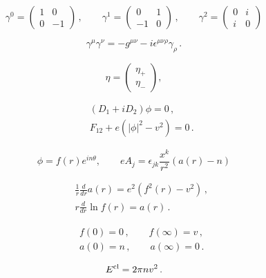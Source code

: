 \documentclass[]{article}
\begin{document}
\begin{equation}
	\gamma^0=\left( \begin{array}{cc}
		1&0\\
		0&-1 \end{array}\right)\,,\qquad
	\gamma^1=\left( \begin{array}{cc}
		0&1\\
		-1&0 \end{array}\right)\,,\qquad
	\gamma^2=\left( \begin{array}{cc}
		0&i\\
		i&0 \end{array}\right) \label{gamma}
\end{equation}

\begin{equation}
	\gamma^\mu \gamma^\nu =-g^{\mu\nu} -i\epsilon^{\mu\nu\rho}\gamma_\rho
	\,.\label{gagag}
\end{equation}

\begin{equation}
	\eta=\left( \begin{array}{c} \eta_+ \\ \eta_- \end{array} \right),
	\label{spinorcom}
\end{equation}

\begin{eqnarray}
	&&(D_1+iD_2)\phi =0\,,\label{bog1}\\
	&&F_{12}+e(|\phi |^2 -v^2 )=0 \,.\label{bog2}
\end{eqnarray}

\begin{equation}
	\phi =f(r) e^{in\theta},\qquad eA_j=\epsilon_{jk} \frac {x^k}{r^2}
	(a(r)-n) \label{vortex}
\end{equation}

\begin{eqnarray}
	&&\frac 1r \frac{d}{dr} a(r)=e^2\left( f^2(r)-v^2 \right)\,,\nonumber\\
	&&r \frac{d}{dr} \ln f(r) = a(r) \,.\label{af-eqs}
\end{eqnarray}

\begin{eqnarray}
	&& f(0)=0\,,\qquad f(\infty )=v \,,\label{cononf}\\
	&& a(0)=n\,,\qquad a(\infty )=0 \,.\label{conona}
\end{eqnarray}

\begin{equation}
	E^{\rm cl}=2\pi n v^2 \,.\label{Eclass}
\end{equation}
\end{document}
